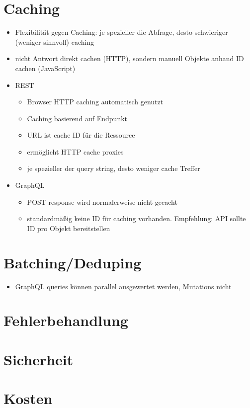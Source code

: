 \section{Caching}
\begin{itemize}
  \item Flexibilität gegen Caching: je spezieller die Abfrage, desto schwieriger (weniger sinnvoll) caching
  \item nicht Antwort direkt cachen (HTTP), sondern manuell Objekte anhand ID cachen (JavaScript)
  \item REST
  \begin{itemize}
    \item Browser HTTP caching automatisch genutzt
    \item Caching basierend auf Endpunkt
    \item URL ist cache ID für die Ressource
    \item ermöglicht HTTP cache proxies
    \item je spezieller der query string, desto weniger cache Treffer
  \end{itemize}
  \item GraphQL
  \begin{itemize}
    \item POST response wird normalerweise nicht gecacht
    \item standardmäßig keine ID für caching vorhanden. Empfehlung: API sollte ID pro Objekt bereitstellen
  \end{itemize}
\end{itemize}

\section{Batching/Deduping}
\begin{itemize}
  \item GraphQL queries können parallel ausgewertet werden, Mutations nicht
\end{itemize}

\section{Fehlerbehandlung}

\section{Sicherheit}

\section{Kosten}

